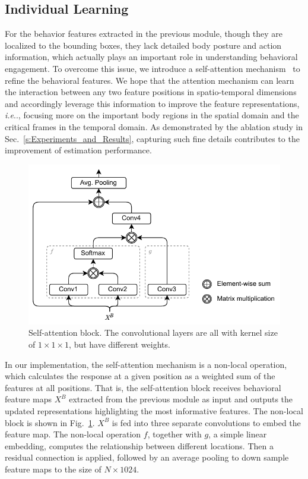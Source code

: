 \documentclass[VANCOUVER,STIX1COL]{WileyNJD-v2}
\makeatletter
\DeclareRobustCommand\onedot{\futurelet\@let@token\@onedot}
\def\@onedot{\ifx\@let@token.\else.\null\fi\xspace}
\def\ie{\emph{i.e}\onedot}
\makeatother
\begin{document}
\subsection{Individual Learning}
\label{subs:Individual_Learning}

For the behavior features extracted in the previous module, though they are localized to the bounding boxes, they lack detailed body posture and action information, which actually plays an important role in understanding behavioral engagement. To overcome this issue, we introduce a self-attention mechanism~\cite{Wang2018NonLocal} to refine the behavioral features. We hope that the attention mechanism can learn the interaction between any two feature positions in spatio-temporal dimensions and accordingly leverage this information to improve the feature representations, \ie, focusing more on the important body regions in the spatial domain and the critical frames in the temporal domain. As demonstrated by the ablation study in Sec.~\ref{s:Experiments_and_Results}, capturing such fine details contributes to the improvement of estimation performance.

\begin{figure}[b]
  \centering
  \includegraphics[width=0.65\linewidth]{assets/self-attention}
  \caption{Self-attention block. The convolutional layers are all with kernel size of $1\times1\times1$, but have different weights.}
  \label{f:self-attention}
\end{figure}

In our implementation, the self-attention mechanism is a non-local operation, which calculates the response at a given position as a weighted sum of the features at all positions. That is, the self-attention block receives behavioral feature maps $X^B$ extracted from the previous module as input and outputs the updated representations highlighting the most informative features. The non-local block is shown in Fig.~\ref{f:self-attention}. $X^B$ is fed into three separate convolutions to embed the feature map. The non-local operation $f$, together with $g$, a simple linear embedding, computes the relationship between different locations. Then a residual connection is applied, followed by an average pooling to down sample feature maps to the size of $N\times1024$.
\end{document}
